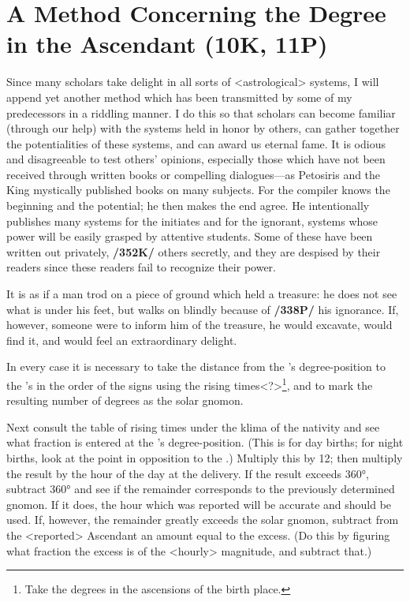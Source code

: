 \section{A Method Concerning the Degree in the Ascendant (10K, 11P)}

Since many scholars take delight in all sorts of <astrological> systems, I will append yet another method which has been transmitted by some of my predecessors in a riddling manner. I do this so that scholars can become familiar (through our help) with the systems held in honor by others, can gather together the potentialities of these systems, and can award us eternal fame. It is odious and disagreeable to test others’ opinions, especially those which have not been received through written books or compelling dialogues—as Petosiris and the King mystically published books on many subjects. For the compiler knows the beginning and the potential; he then makes the end agree. He intentionally publishes many systems for the initiates and for the ignorant, systems whose power will be easily grasped by attentive
students. Some of these have been written out privately, \textbf{/352K/} others secretly, and they are despised by their readers since these readers fail to recognize their power. 

It is as if a man trod on a piece of ground which held a treasure: he does not see what is under his feet, but walks on blindly because of \textbf{/338P/} his ignorance. If, however, someone were to inform him of the treasure, he would excavate, would find it, and would feel an extraordinary delight.

In every case it is necessary to take the distance from the \Sun’s degree-position to the \Moon’s in the order of the signs using the rising times<?>\footnote{Take the degrees in the ascensions of the birth place.}, and to mark the resulting number of degrees as the solar
gnomon. 

Next consult the table of rising times under the klima of the nativity and see what fraction is entered at the \Sun’s degree-position. (This is for day births; for night births, look at the point in opposition to the \Sun.) Multiply this by 12; then multiply the result by the hour of the day at the delivery. If the result exceeds 360°, subtract 360° and see if the remainder corresponds to the previously determined gnomon. If it does, the hour which was reported will be accurate and should be used. If,
however, the remainder greatly exceeds the solar gnomon, subtract from the <reported> Ascendant an amount equal to the excess. (Do this by figuring what fraction the excess is of the <hourly> magnitude,
and subtract that.) 

